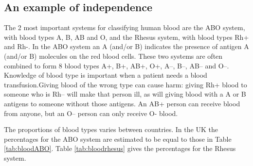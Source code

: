 \documentclass[
  british,
  11pt,
  openany, a4paper]{book}
\begin{document}
\subsection{An example of independence}\label{bloodindep}

The 2 most important systems for classifying human blood are the ABO system, with blood types A, B, AB and O, and the Rhesus system, with blood types Rh+ and Rh-. In the ABO system an A (and/or B) indicates the presence of antigen A (and/or B) molecules on the red blood cells. These two systems are often combined to form 8 blood types A+, B+, AB+, O+, A--, B--, AB-- and O--. Knowledge of blood type is important when a patient needs a blood transfusion.Giving blood of the wrong type can cause harm: giving Rh+ blood to someone who is Rh-- will make that person ill, as will giving blood with a A or B antigens to someone without those antigens. An AB+ person can receive blood from anyone, but an O-- person can only receive O- blood.

The proportions of blood types varies between countries. In the UK the percentages for the ABO system are estimated to be equal to those in Table \ref{tab:bloodABO}. Table \ref{tab:bloodrhesus} gives the percentages for the Rhesus system.

 
  \providecommand{\huxb}[2]{\arrayrulecolor[RGB]{#1}\global\arrayrulewidth=#2pt}
  \providecommand{\huxvb}[2]{\color[RGB]{#1}\vrule width #2pt}
  \providecommand{\huxtpad}[1]{\rule{0pt}{#1}}
  \providecommand{\huxbpad}[1]{\rule[-#1]{0pt}{#1}}
\end{document}
